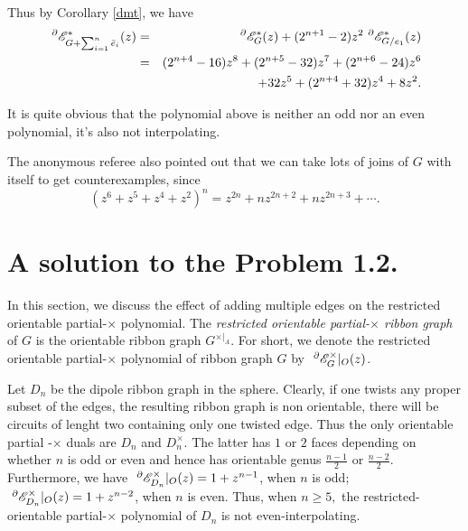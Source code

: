    Thus by Corollary \ref{dmt}, we have
 \begin{eqnarray*}
~^{\partial}{{\mathscr{E}}}^{*}_{G+ \sum ^{n}_{i=1}\bar{e}_{i}}(z)&=&~^{\partial}{{\mathscr{E}}}^{*}_{G}(z)
+(2^{n+1}-2)z^{2}~^{\partial}{{\mathscr{E}}}^{*}_{G/ e_{1}}(z)\notag\\
&=&(2^{n+4}-16)z^{8}+(2^{n+5}-32)z^{7}+(2^{n+6}-24)z^{6}\\ &&+ 32z^{5}+(2^{n+4}+32)z^{4}+8z^{2}.
\end{eqnarray*}

It is quite obvious that the polynomial above is neither an odd nor an
even polynomial,  it's also not interpolating.

 \begin{rem}The anonymous referee also pointed out that we can take lots of joins of $G$ with itself to get counterexamples, since $$(z^{6}+z^{5}+z^{4}+z^{2})^{n}=z^{2n}+nz^{2n+2}+nz^{2n+3}+\cdots.$$
\end{rem}



\section{ A solution  to the  Problem 1.2.}
{{ In this section, we discuss the effect
of adding multiple edges on the restricted orientable
 partial-$\times$ polynomial. The \textit{restricted orientable partial-$\times$ ribbon graph} of $G$ is the orientable ribbon graph $G^{\times|_{A}}$.
For short, we
 denote the restricted orientable partial-$\times$ polynomial of ribbon graph $G$ by  $~^{\partial}{{\mathscr{E}}}^{\times}_{G}|_O(z)$.}}

 \begin{example}\label{dnn}
{Let $D_{n}$ be the dipole  ribbon graph in the sphere.  Clearly, if
one twists any proper subset of the edges, the resulting ribbon graph is non orientable, there will be circuits of lenght two containing only one twisted
edge. Thus the only orientable partial -$\times$ duals are $D_{n}$ and $D_{n}^{\times}$. The latter
has $1$ or $2$ faces depending on whether $n$ is odd or even and hence has
orientable genus $\frac{n-1}{2}$ or $\frac{n-2}{2}$. Furthermore, we have $~^{\partial}{{\mathscr{E}}}^{\times}_{D_{n}}|_O(z)=1+z^{n-1}$, when $n$ is odd;
$~^{\partial}{{\mathscr{E}}}^{\times}_{D_{n}}|_O(z)=1+z^{n-2}$, when $n$ is even.
Thus,   when $n\geq 5,$  the restricted-orientable partial-$\times$ polynomial of $D_{n}$ is not even-interpolating.}

\end{example}



